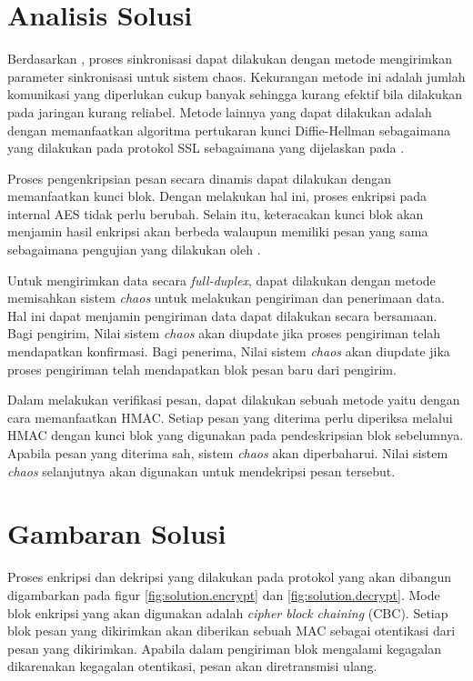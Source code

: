 \section{Analisis Solusi} 

Berdasarkan \textcite{lin2021}, proses sinkronisasi dapat dilakukan dengan metode mengirimkan parameter sinkronisasi untuk sistem chaos. Kekurangan metode ini adalah jumlah komunikasi yang diperlukan cukup banyak sehingga kurang efektif bila dilakukan pada jaringan kurang reliabel. Metode lainnya yang dapat dilakukan adalah dengan memanfaatkan algoritma pertukaran kunci Diffie-Hellman sebagaimana yang dilakukan pada protokol SSL sebagaimana yang dijelaskan pada \textcite{munir2019}.

Proses pengenkripsian pesan secara dinamis dapat dilakukan dengan memanfaatkan kunci blok. Dengan melakukan hal ini, proses enkripsi pada internal AES tidak perlu berubah. Selain itu, keteracakan kunci blok akan menjamin hasil enkripsi akan berbeda walaupun memiliki pesan yang sama sebagaimana pengujian yang dilakukan oleh \textcite{lin2021}.

Untuk mengirimkan data secara \emph{full-duplex}, dapat dilakukan dengan metode memisahkan sistem \emph{chaos} untuk melakukan pengiriman dan penerimaan data. Hal ini dapat menjamin pengiriman data dapat dilakukan secara bersamaan. Bagi pengirim, Nilai sistem \emph{chaos} akan diupdate jika proses pengiriman telah mendapatkan konfirmasi. Bagi penerima, Nilai sistem \emph{chaos} akan diupdate jika proses pengiriman telah mendapatkan blok pesan baru dari pengirim.

Dalam melakukan verifikasi pesan, dapat dilakukan sebuah metode yaitu dengan cara memanfaatkan HMAC. Setiap pesan yang diterima perlu diperiksa melalui HMAC dengan kunci blok yang digunakan pada pendeskripsian blok sebelumnya. Apabila pesan yang diterima sah, sistem \emph{chaos} akan diperbaharui. Nilai sistem \emph{chaos} selanjutnya akan digunakan untuk mendekripsi pesan tersebut.

\section{Gambaran Solusi}

Proses enkripsi dan dekripsi yang dilakukan pada protokol yang akan dibangun digambarkan pada figur \ref{fig:solution.encrypt} dan \ref{fig:solution.decrypt}. Mode blok enkripsi yang akan digunakan adalah \emph{cipher block chaining} (CBC). Setiap blok pesan yang dikirimkan akan diberikan sebuah MAC sebagai otentikasi dari pesan yang dikirimkan. Apabila dalam pengiriman blok mengalami kegagalan dikarenakan kegagalan otentikasi, pesan akan diretransmisi ulang. 


